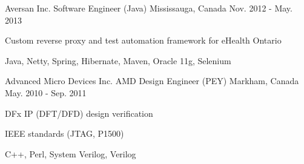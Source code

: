 \begin{cventries}
  \cventry
    {Aversan Inc.} %
    {Software Engineer (Java)} %
    {Mississauga, Canada} %
    {Nov. 2012 - May. 2013} %
    {
      \begin{cvitems} %
        \item {Custom reverse proxy and test automation framework for eHealth Ontario}
        \item {Java, Netty, Spring, Hibernate, Maven, Oracle 11g, Selenium}
      \end{cvitems}
    }

  \cventry
    {Advanced Micro Devices Inc.} %
    {AMD Design Engineer (PEY)} %
    {Markham, Canada} %
    {May. 2010 - Sep. 2011} %
    {
      \begin{cvitems} %
        \item {DFx IP (DFT/DFD) design verification}
        \item {IEEE standards (JTAG, P1500)}
        \item {C++, Perl, System Verilog, Verilog}
      \end{cvitems}
    }

\end{cventries}
